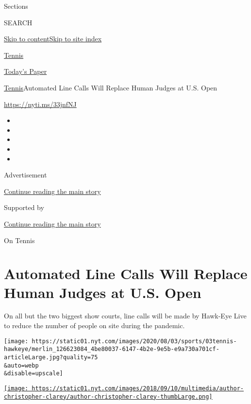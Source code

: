 Sections

SEARCH

\protect\hyperlink{site-content}{Skip to
content}\protect\hyperlink{site-index}{Skip to site index}

\href{https://www.nytimes.com/section/sports/tennis}{Tennis}

\href{https://myaccount.nytimes.com/auth/login?response_type=cookie\&client_id=vi}{}

\href{https://www.nytimes.com/section/todayspaper}{Today's Paper}

\href{/section/sports/tennis}{Tennis}\textbar{}Automated Line Calls Will
Replace Human Judges at U.S. Open

\url{https://nyti.ms/33jnfNJ}

\begin{itemize}
\item
\item
\item
\item
\item
\end{itemize}

Advertisement

\protect\hyperlink{after-top}{Continue reading the main story}

Supported by

\protect\hyperlink{after-sponsor}{Continue reading the main story}

On Tennis

\hypertarget{automated-line-calls-will-replace-human-judges-at-us-open}{%
\section{Automated Line Calls Will Replace Human Judges at U.S.
Open}\label{automated-line-calls-will-replace-human-judges-at-us-open}}

On all but the two biggest show courts, line calls will be made by
Hawk-Eye Live to reduce the number of people on site during the
pandemic.

\texttt{[image: https://static01.nyt.com/images/2020/08/03/sports/03tennis-hawkeye/merlin\_126623084\_4be80037-6147-4b2e-9e5b-e9a730a701cf-articleLarge.jpg?quality=75\\\&auto=webp\\\&disable=upscale]}

\href{https://www.nytimes.com/by/christopher-clarey}{\texttt{[image: https://static01.nyt.com/images/2018/09/10/multimedia/author-christopher-clarey/author-christopher-clarey-thumbLarge.png]}}

